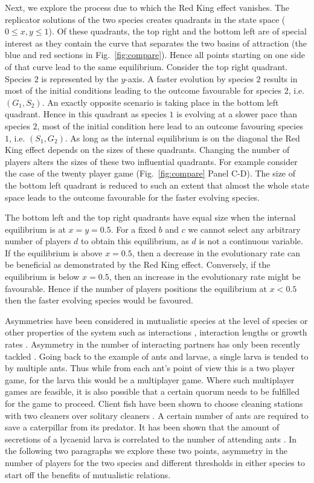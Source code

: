 \documentclass[aps,pre,amsfonts,floatfix, onecolumn,showkeys]{revtex4-1}
\begin{document}
Next, we explore the process due to which the Red King effect vanishes.
The replicator solutions of the two species creates quadrants in the state space ($0 \leq x,y \leq 1$).
Of these quadrants, the top right and the bottom left are of special interest as they contain the curve that separates the two basins of attraction (the blue and red sections in Fig.~\ref{fig:compare}). 
Hence all points starting on one side of that curve lead to the same equilibrium.
Consider the top right quadrant.
Species $2$ is represented by the $y$-axis.
A faster evolution by species $2$ results in most of the initial conditions leading to the outcome favourable for species $2$, i.e. $(G_1,S_2)$.
An exactly opposite scenario is taking place in the bottom left quadrant.
Hence in this quadrant as species $1$ is evolving at a slower pace than species $2$, most of the initial condition here lead to an outcome favouring species $1$, i.e. $(S_1, G_2)$.
As long as the internal equilibrium is on the diagonal the Red King effect depends on the sizes of these quadrants.
Changing the number of players alters the sizes of these two influential quadrants.
For example consider the case of the twenty player game (Fig.~\ref{fig:compare} Panel C-D).
The size of the bottom left quadrant is reduced to such an extent that almost the whole state space leads to the outcome favourable for the faster evolving species.


The bottom left and the top right quadrants have equal size when the internal equilibrium is at $x = y = 0.5$.
For a fixed $b$ and $c$ we cannot select any arbitrary number of players $d$ to obtain this equilibrium, as $d$ is not a continuous variable.
If the equilibrium is above $x = 0.5$, then a decrease in the evolutionary rate can be beneficial as demonstrated by the Red King effect. 
Conversely, if the equilibrium is below $x=0.5$, then an increase in the evolutionary rate might be favourable.
Hence if the number of players positions the equilibrium at $x<0.5$ then the faster evolving species would be favoured.

Asymmetries have been considered in mutualistic species at the level of species or other properties of the system such as interactions \cite{noe:Ethology:1991}, interaction lengths \cite{johnstone:ECL:2002} or growth rates \cite{bergstrom:PNAS:2003}.
Asymmetry in the number of interacting partners has only been recently tackled \cite{wang:JRSI:2011}.
Going back to the example of ants and larvae, a single larva is tended to by multiple ants.
Thus while from each ant's point of view this is a two player game, for the larva this would be a multiplayer game.
Where such multiplayer games are feasible, it is also possible that a certain quorum needs to be fulfilled for the game to proceed.
Client fish have been shown to choose cleaning stations with two cleaners over solitary cleaners \cite{bshary:AB:2002}.
A certain number of ants are required to save a caterpillar from its predator.
It has been shown that the amount of secretions of a lycaenid larva is correlated to the number of attending ants \cite{axen:BE:1998}.
In the following two paragraphs we explore these two points, asymmetry in the number of players for the two species and different thresholds in either species to start off the benefits of mutualistic relations.
\end{document}
